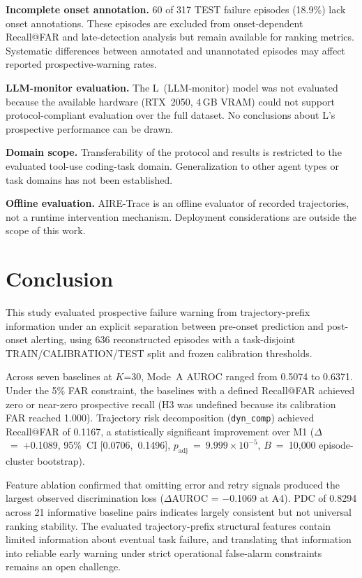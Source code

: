 \documentclass[conference]{IEEEtran}
\begin{document}
\textbf{Incomplete onset annotation.} 60 of 317 TEST failure episodes
(18.9\%) lack onset annotations. These episodes are excluded from
onset-dependent Recall@FAR and late-detection analysis but remain
available for ranking metrics. Systematic differences between annotated
and unannotated episodes may affect reported prospective-warning rates.

\textbf{LLM-monitor evaluation.} The L~(LLM-monitor) model was not
evaluated because the available hardware (RTX~2050, 4\,GB VRAM) could
not support protocol-compliant evaluation over the full dataset. No
conclusions about L's prospective performance can be drawn.

\textbf{Domain scope.} Transferability of the protocol and results is
restricted to the evaluated tool-use coding-task domain. Generalization
to other agent types or task domains has not been established.

\textbf{Offline evaluation.} AIRE-Trace is an offline evaluator of
recorded trajectories, not a runtime intervention mechanism. Deployment
considerations are outside the scope of this work.

\section{Conclusion}

This study evaluated prospective failure warning from trajectory-prefix
information under an explicit separation between pre-onset prediction
and post-onset alerting, using 636 reconstructed episodes with a
task-disjoint TRAIN/CALIBRATION/TEST split and frozen calibration
thresholds.

Across seven baselines at $K$=30, Mode~A AUROC ranged from 0.5074 to
0.6371. Under the 5\% FAR constraint, the baselines with a defined
Recall@FAR achieved zero or near-zero prospective recall (H3 was
undefined because its calibration FAR reached 1.000). Trajectory
risk decomposition (\texttt{dyn\_comp}) achieved Recall@FAR of 0.1167,
a statistically significant improvement over M1
($\Delta$~=~+0.1089, 95\%~CI [0.0706,~0.1496],
$p_{\mathrm{adj}}$~=~$9.999 \times 10^{-5}$, $B$~=~10{,}000
episode-cluster bootstrap).

Feature ablation confirmed that omitting error and retry signals
produced the largest observed discrimination loss ($\Delta$AUROC = $-$0.1069
at A4). PDC of
0.8294 across 21 informative baseline pairs indicates largely consistent
but not universal ranking stability. The evaluated trajectory-prefix
structural features contain limited information about eventual task
failure, and translating that information into reliable early warning
under strict operational false-alarm constraints remains an open
challenge.
\end{document}
